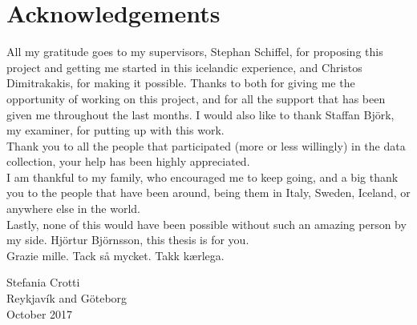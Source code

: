 \thispagestyle{plain}			%
\section*{Acknowledgements}
All my gratitude goes to my supervisors, Stephan Schiffel, for proposing this project and getting me started in this icelandic experience, and Christos Dimitrakakis, for making it possible. Thanks to both for giving me the opportunity of working on this project, and for all the support that has been given me throughout the last months. I would also like to thank Staffan Björk, my examiner, for putting up with this work.\\

Thank you to all the people that participated (more or less willingly) in the data collection, your help has been highly appreciated.\\

I am thankful to my family, who encouraged me to keep going, and a big thank you to the people that have been around, being them in Italy, Sweden, Iceland, or anywhere else in the world.\\

Lastly, none of this would have been possible without such an amazing person by my side. Hjörtur Björnsson, this thesis is for you.\\

Grazie mille. Tack så mycket. Takk kærlega.

\vspace{1.5cm}
\begin{flushright}
Stefania Crotti\\
Reykjavík and Göteborg\\
October 2017
\end{flushright}

\newpage				%
\thispagestyle{empty}
\mbox{}